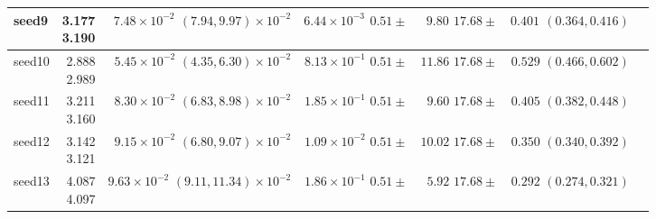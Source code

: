 \begin{table}
\begin{tabular}{lrrrrrr}
\midrule
\specialcell{seed9 \\ \vphantom{fg}}  & \specialcell{3.177\\3.190} &       \specialcell{$7.48 \times 10^{-2}$\\$(7.94, 9.97) \times 10^{-2}$}  &  \specialcell{$6.44 \times 10^{-3}$\\ $0.51 \pm$}  &  \specialcell{$9.80$ \\ $17.68 \pm$}  &  \specialcell{$0.401$ \\ $(0.364, 0.416)$} \\
\midrule
\specialcell{seed10 \\ \vphantom{fg}}  & \specialcell{2.888\\2.989} &       \specialcell{$5.45 \times 10^{-2}$\\$(4.35, 6.30) \times 10^{-2}$}  &  \specialcell{$8.13 \times 10^{-1}$\\ $0.51 \pm$}  &  \specialcell{$11.86$ \\ $17.68 \pm$}  &  \specialcell{$0.529$ \\ $(0.466, 0.602)$} \\
\midrule
\specialcell{seed11 \\ \vphantom{fg}}  & \specialcell{3.211\\3.160} &       \specialcell{$8.30 \times 10^{-2}$\\$(6.83, 8.98) \times 10^{-2}$}  &  \specialcell{$1.85 \times 10^{-1}$\\ $0.51 \pm$}  &  \specialcell{$9.60$ \\ $17.68 \pm$}  &  \specialcell{$0.405$ \\ $(0.382, 0.448)$} \\
\midrule
\specialcell{seed12 \\ \vphantom{fg}}  & \specialcell{3.142\\3.121} &       \specialcell{$9.15 \times 10^{-2}$\\$(6.80, 9.07) \times 10^{-2}$}  &  \specialcell{$1.09 \times 10^{-2}$\\ $0.51 \pm$}  &  \specialcell{$10.02$ \\ $17.68 \pm$}  &  \specialcell{$0.350$ \\ $(0.340, 0.392)$} \\
\midrule
\specialcell{seed13 \\ \vphantom{fg}}  & \specialcell{4.087\\4.097} &       \specialcell{$9.63 \times 10^{-2}$\\$(9.11, 11.34) \times 10^{-2}$}  &  \specialcell{$1.86 \times 10^{-1}$\\ $0.51 \pm$}  &  \specialcell{$5.92$ \\ $17.68 \pm$}  &  \specialcell{$0.292$ \\ $(0.274, 0.321)$} \\

\end{tabular}
\end{table}
